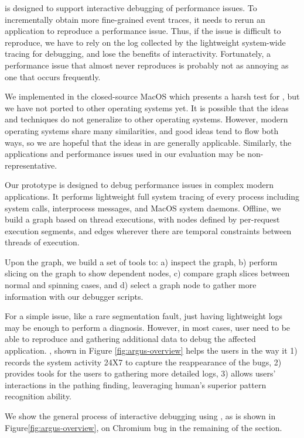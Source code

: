 \xxx is designed to support interactive debugging of performance issues.
To incrementally obtain more fine-grained event traces, it needs to rerun
an application to reproduce a performance issue.  Thus, if the issue is
difficult to reproduce, we have to rely on the log collected by the
lightweight system-wide tracing for debugging, and lose the benefits of
interactivity.  Fortunately, a performance issue that almost never
reproduces is probably not as annoying as one that occurs frequently.

We implemented \xxx in the closed-source MacOS which presents a harsh test
for \xxx, but we have not ported \xxx to other operating systems yet.  It
is possible that the ideas and techniques do not generalize to other
operating systems.  However, modern operating systems share many
similarities, and good ideas tend to flow both ways, so we are hopeful
that the ideas in \xxx are generally applicable.  Similarly, the
applications and performance issues used in our evaluation may be
non-representative.

\iffalse

Our \xxx prototype is designed to debug performance issues in complex modern applications.
It performs lightweight full system tracing of every process including system calls,
interprocess messages, and MacOS system daemons.
Offline, we build a graph based on thread executions, with nodes defined by
per-request execution segments,
and edges wherever there are temporal constraints between threads of execution.

Upon the graph, we build a set of tools to:
a) inspect the graph,
b) perform slicing on the graph to show dependent nodes,
c) compare graph slices between normal and spinning cases, and
d) select a graph node to gather more information with our debugger scripts.

For a simple issue, like a rare segmentation fault,
just having lightweight logs may be enough to perform a diagnosis.
However, in most cases, user need to be able to reproduce and gathering
additional data to debug the affected application.
\xxx, shown in Figure \ref{fig:argus-overview} helps the users in the way
it 1) records the system activity 24X7 to capture the reappearance of the bugs,
2) provides tools for the users to gathering more detailed logs,
3) allows users' interactions in the pathing finding,
leaveraging human's superior pattern recognition ability.

We show the general process of interactive debugging using \xxx,
as is shown in Figure\ref{fig:argus-overview},
on Chromium bug in the remaining of the section.

